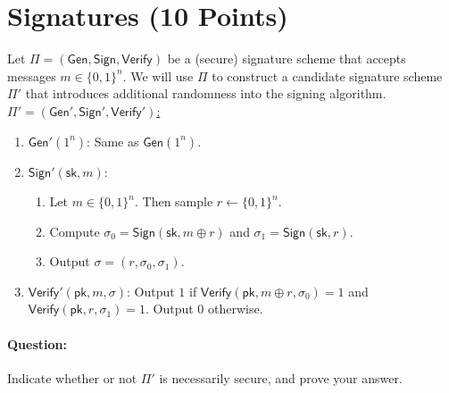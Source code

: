 \documentclass[11pt]{article}
\numberwithin{equation}{section}
\newcommand{\Gen}{\mathsf{Gen}}
\newcommand{\Sign}{\mathsf{Sign}}
\newcommand{\Verify}{\mathsf{Verify}}
\newcommand{\pk}{\mathsf{pk}}
\newcommand{\sk}{\mathsf{sk}}
\newcommand{\bin}{\{0,1\}}
\newcommand{\bit}{\bin}
\begin{document}
\section{Signatures (10 Points)}
Let $\Pi = (\Gen, \Sign, \Verify)$ be a (secure) signature scheme that accepts messages $m \in \bit^n$. We will use $\Pi$ to construct a candidate signature scheme $\Pi'$ that introduces additional randomness into the signing algorithm.\\

\noindent\underline{$\Pi' = (\Gen', \Sign', \Verify')$:}
    \begin{enumerate}
        \item $\Gen'(1^n)$: Same as $\Gen(1^n)$.
        \item $\Sign'(\sk, m)$: 
        \begin{enumerate}
            \item Let $m \in \bit^n$. Then sample $r \leftarrow \bit^n$.
            \item Compute $\sigma_0 = \Sign(\sk, m \oplus r)$ and $\sigma_1 = \Sign(\sk, r)$.
            \item Output $\sigma = (r, \sigma_0, \sigma_1)$.
        \end{enumerate}
        \item $\Verify'(\pk, m, \sigma)$: Output $1$ if $\Verify(\pk, m \oplus r, \sigma_0) = 1$ and $\Verify(\pk, r, \sigma_1) = 1$. Output $0$ otherwise.
    \end{enumerate}

\paragraph{Question:} Indicate whether or not $\Pi'$ is necessarily secure, and prove your answer.\\
\end{document}
